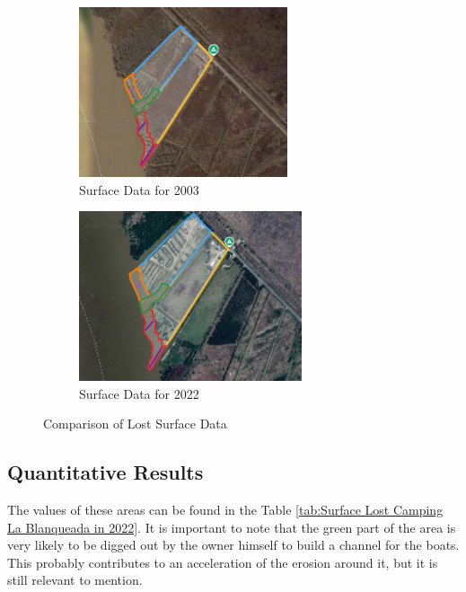 \begin{figure}[H]
    \centering
    \begin{subfigure}[b]{0.45\textwidth} %
        \includegraphics[width=\linewidth, height=5cm]{figures/appendix-g/delen2003.png}
        \caption{Surface Data for 2003}
        \label{fig:surface2003.1}
    \end{subfigure}
    \hfill
    \begin{subfigure}[b]{0.45\textwidth} %
        \includegraphics[width=\linewidth, height=5cm]{figures/appendix-g/delen2022.png}
        \caption{Surface Data for 2022}
        \label{fig:surface2022.1}
    \end{subfigure}
    \caption{Comparison of Lost Surface Data}
    \label{fig:surfacelost_comparison}
\end{figure}


\subsection{Quantitative Results}
\label{section:quantitative_results}

The values of these areas can be found in the Table \ref{tab:Surface Lost Camping La Blanqueada in 2022}.
It is important to note that the green part of the area is very likely to be digged out by the owner himself to build a channel for the boats. This probably contributes to an acceleration of the erosion around it, but it is still relevant to mention.

